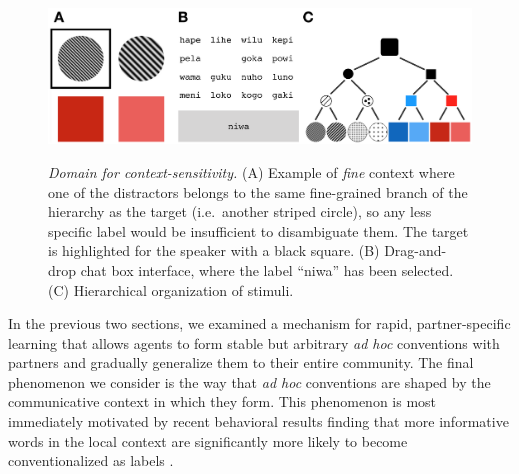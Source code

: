 
\begin{figure}[t]
\begin{center}
{\includegraphics[scale=.63]{./figures/Sec2-design.png}}
{\caption{{\emph{Domain for context-sensitivity.} (A) Example of \emph{fine} context where one of the distractors belongs to the same fine-grained branch of the hierarchy as the target (i.e.\ another striped circle), so any less specific label would be insufficient to disambiguate them. The target is highlighted for the speaker with a black square. (B) Drag-and-drop chat box interface, where the label ``niwa'' has been selected. (C) Hierarchical organization of stimuli.\label{fig:context_design}}}}
\vspace{-2ex}
\end{center}
\end{figure}

In the previous two sections, we examined a mechanism for rapid, partner-specific learning that allows agents to form stable but arbitrary \emph{ad hoc} conventions with partners and gradually generalize them to their entire community. 
The final phenomenon we consider is the way that \emph{ad hoc} conventions are shaped by the communicative context in which they form.
This phenomenon is most immediately motivated by recent behavioral results finding that more informative words in the local context are significantly more likely to become conventionalized as labels \cite{hawkins2020characterizing}.

